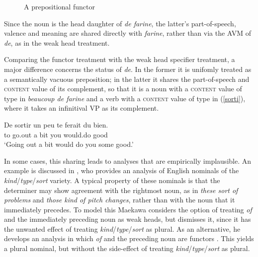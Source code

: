 \documentclass[output=paper
                ,modfonts
                ,nonflat
	        ,collection
	        ,collectionchapter
	        ,collectiontoclongg
 	        ,biblatex
                ,babelshorthands
                ,newtxmath
                ,draftmode
                ,colorlinks, citecolor=brown
]{./langsci/langscibook}
\begin{document}
\begin{figure}
\centering
{}
\caption{\label{beau} A prepositional functor}
\end{figure}

Since the noun is the head daughter of \emph{de farine}, the latter's 
part-of-speech, valence and meaning are shared directly with \emph{farine}, 
rather than via the AVM of \emph{de}, as in the weak head treatment. 

Comparing the functor treatment with the weak head specifier treatment,  
a major difference concerns the status of \emph{de}. In the former it is 
unifomly treated as a semantically vacuous preposition; in the latter it shares 
the part-of-speech and \textsc{content} value of its complement, so that it is 
a noun with a \textsc{content} value of type  in 
\emph{beaucoup de farine} and a verb with a \textsc{content} value of type 
 in (\ref{sorti}), where it takes 
an infinitival VP as its complement.   

\begin{exe} 
\ex\label{sorti}   
\gll   De sortir un peu te ferait du bien. \\
       to go.out a bit you would.do {} good \\
\trans `Going out a bit would do you some good.'
\end{exe}  

\noindent
In some cases, this sharing leads to analyses that are empirically implausible. 
An example is discussed in \citet{Maekawa15}, who provides  
an analysis of English nominals of the \emph{kind}/\emph{type}/\emph{sort} variety.  
A typical property of these nominals is that the determiner may show agreement with the 
rightmost noun, as in \emph{these sort of problems} and \emph{those kind of pitch changes},
rather than with the noun that it immediately precedes. 
To model this Maekawa considers the option of treating \emph{of} and the immediately 
preceding noun as weak heads, but dismisses it, since it has the unwanted effect of treating 
\emph{kind}/\emph{type}/\emph{sort} as plural. 
As an alternative, he develops an analysis in which \emph{of} and 
the preceding noun are functors \citep[149]{Maekawa15}. This yields a plural nominal, but 
without the side-effect of treating \emph{kind}/\emph{type}/\emph{sort} as plural. 
\end{document}

